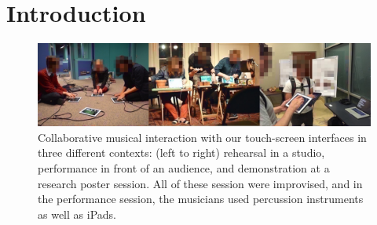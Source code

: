 \documentclass{sigchi}
\begin{document}





\section{Introduction}

\begin{figure}
  \centering
  \includegraphics[width=\linewidth]{figures/three-performance-contexts}
  \caption{Collaborative musical interaction with our touch-screen
    interfaces in three different contexts: (left to right) rehearsal
    in a studio,
    performance in front of an audience, and demonstration at a
    research poster session. All of these session were improvised,
    and in the performance session, the musicians used percussion
    instruments as well as iPads.
    \label{fig:three-performance-contexts}}
\end{figure}
\end{document}
